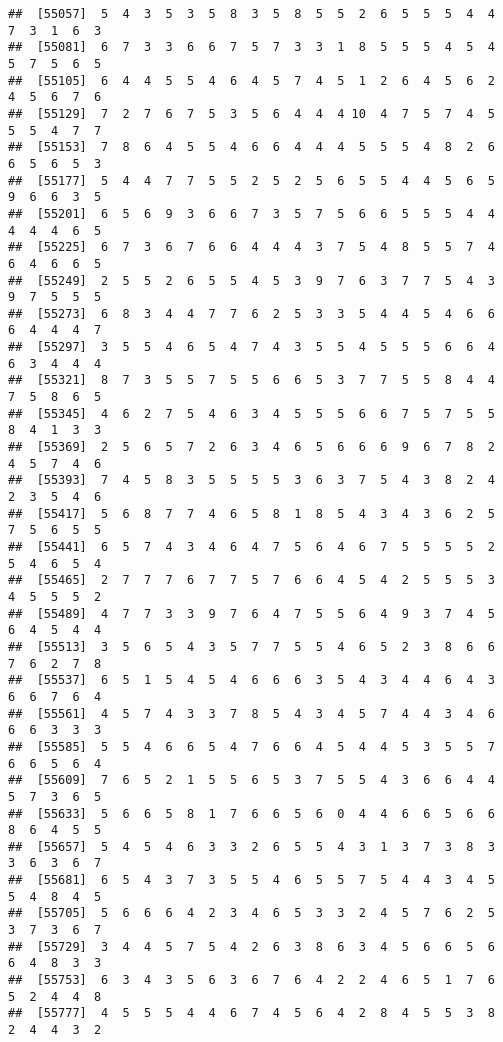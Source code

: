 \documentclass[
]{book}
\begin{document}
\begin{verbatim}
##  [55057]  5  4  3  5  3  5  8  3  5  8  5  5  2  6  5  5  5  4  4  7  3  1  6  3
##  [55081]  6  7  3  3  6  6  7  5  7  3  3  1  8  5  5  5  4  5  4  5  7  5  6  5
##  [55105]  6  4  4  5  5  4  6  4  5  7  4  5  1  2  6  4  5  6  2  4  5  6  7  6
##  [55129]  7  2  7  6  7  5  3  5  6  4  4  4 10  4  7  5  7  4  5  5  5  4  7  7
##  [55153]  7  8  6  4  5  5  4  6  6  4  4  4  5  5  5  4  8  2  6  6  5  6  5  3
##  [55177]  5  4  4  7  7  5  5  2  5  2  5  6  5  5  4  4  5  6  5  9  6  6  3  5
##  [55201]  6  5  6  9  3  6  6  7  3  5  7  5  6  6  5  5  5  4  4  4  4  4  6  5
##  [55225]  6  7  3  6  7  6  6  4  4  4  3  7  5  4  8  5  5  7  4  6  4  6  6  5
##  [55249]  2  5  5  2  6  5  5  4  5  3  9  7  6  3  7  7  5  4  3  9  7  5  5  5
##  [55273]  6  8  3  4  4  7  7  6  2  5  3  3  5  4  4  5  4  6  6  6  4  4  4  7
##  [55297]  3  5  5  4  6  5  4  7  4  3  5  5  4  5  5  5  6  6  4  6  3  4  4  4
##  [55321]  8  7  3  5  5  7  5  5  6  6  5  3  7  7  5  5  8  4  4  7  5  8  6  5
##  [55345]  4  6  2  7  5  4  6  3  4  5  5  5  6  6  7  5  7  5  5  8  4  1  3  3
##  [55369]  2  5  6  5  7  2  6  3  4  6  5  6  6  6  9  6  7  8  2  4  5  7  4  6
##  [55393]  7  4  5  8  3  5  5  5  5  3  6  3  7  5  4  3  8  2  4  2  3  5  4  6
##  [55417]  5  6  8  7  7  4  6  5  8  1  8  5  4  3  4  3  6  2  5  7  5  6  5  5
##  [55441]  6  5  7  4  3  4  6  4  7  5  6  4  6  7  5  5  5  5  2  5  4  6  5  4
##  [55465]  2  7  7  7  6  7  7  5  7  6  6  4  5  4  2  5  5  5  3  4  5  5  5  2
##  [55489]  4  7  7  3  3  9  7  6  4  7  5  5  6  4  9  3  7  4  5  6  4  5  4  4
##  [55513]  3  5  6  5  4  3  5  7  7  5  5  4  6  5  2  3  8  6  6  7  6  2  7  8
##  [55537]  6  5  1  5  4  5  4  6  6  6  3  5  4  3  4  4  6  4  3  6  6  7  6  4
##  [55561]  4  5  7  4  3  3  7  8  5  4  3  4  5  7  4  4  3  4  6  6  6  3  3  3
##  [55585]  5  5  4  6  6  5  4  7  6  6  4  5  4  4  5  3  5  5  7  6  6  5  6  4
##  [55609]  7  6  5  2  1  5  5  6  5  3  7  5  5  4  3  6  6  4  4  5  7  3  6  5
##  [55633]  5  6  6  5  8  1  7  6  6  5  6  0  4  4  6  6  5  6  6  8  6  4  5  5
##  [55657]  5  4  5  4  6  3  3  2  6  5  5  4  3  1  3  7  3  8  3  3  6  3  6  7
##  [55681]  6  5  4  3  7  3  5  5  4  6  5  5  7  5  4  4  3  4  5  5  4  8  4  5
##  [55705]  5  6  6  6  4  2  3  4  6  5  3  3  2  4  5  7  6  2  5  3  7  3  6  7
##  [55729]  3  4  4  5  7  5  4  2  6  3  8  6  3  4  5  6  6  5  6  6  4  8  3  3
##  [55753]  6  3  4  3  5  6  3  6  7  6  4  2  2  4  6  5  1  7  6  5  2  4  4  8
##  [55777]  4  5  5  5  4  4  6  7  4  5  6  4  2  8  4  5  5  3  8  2  4  4  3  2

\end{verbatim}
\end{document}

